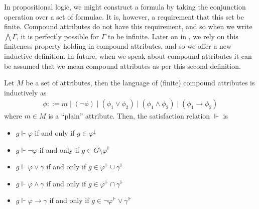 In propositional logic, we might construct a formula by taking the conjunction operation over a set of formulae. It is, however,
a requirement that this set be finite. Compound attributes do not have this requirement, and so when we write
$\bigwedge \Gamma$, it is perfectly possible for $\Gamma$ to be infinite. Later on in
, we rely on this finiteness property holding in compound attributes, and so
we offer a new inductive definition. In future, when we speak about compound attributes it can be assumed that we mean
compound attributes as per this second definition.

\begin{definition}
	\label{definition:compound-attributes-2} Let $M$ be a set of attributes, then the language of (finite) compound
	attributes is inductively as
	\begin{align}
		\phi ::= m \mid (\neg \phi) \mid (\phi_{1}\lor \phi_{2}) \mid (\phi_{1}\land \phi_{2}) \mid (\phi_{1}\rightarrow \phi_{2})
	\end{align}
	where $m \in M$ is a ``plain'' attribute. Then, the satisfaction relation $\Vdash$ is

	\begin{itemize}
		\item $g \Vdash \varphi$ if and only if $g \in \varphi^{\downarrow}$

		\item $g \Vdash \neg \varphi$ if and only if $g \in G \setminus \varphi^{\Vdash}$

		\item $g \Vdash \varphi \lor \gamma$ if and only if $g \in \varphi^{\Vdash}\cup \gamma^{\Vdash}$

		\item $g \Vdash \varphi \land \gamma$ if and only if $g \in \varphi^{\Vdash}\cap \gamma^{\Vdash}$

		\item $g \Vdash \varphi \rightarrow \gamma$ if and only if $g \in \neg \varphi^{\Vdash}\lor \gamma^{\Vdash}$
	\end{itemize}
\end{definition}

